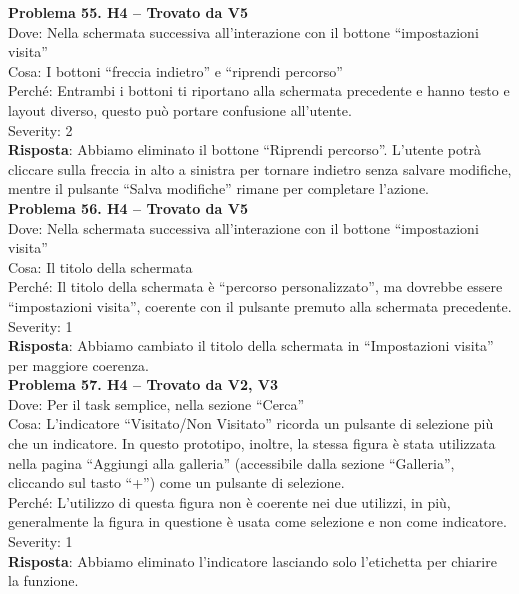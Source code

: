 \documentclass{article}
\begin{document}
\noindent \textbf{Problema 55. H4 – Trovato da V5} \\
Dove: Nella schermata successiva all’interazione con il bottone “impostazioni visita” \\
Cosa: I bottoni “freccia indietro” e “riprendi percorso” \\
Perché: Entrambi i bottoni ti riportano alla schermata precedente e hanno testo e layout diverso, questo può portare confusione all’utente. \\
Severity: 2 \\
\textbf{Risposta}: Abbiamo eliminato il bottone “Riprendi percorso”. L’utente potrà cliccare sulla freccia in alto a sinistra per tornare indietro senza salvare modifiche, mentre il pulsante “Salva modifiche” rimane per completare l’azione.\\

\noindent \textbf{Problema 56. H4 – Trovato da V5} \\
Dove: Nella schermata successiva all’interazione con il bottone “impostazioni visita” \\
Cosa: Il titolo della schermata \\
Perché: Il titolo della schermata è “percorso personalizzato”, ma dovrebbe essere “impostazioni visita”, coerente con il pulsante premuto alla schermata precedente. \\
Severity: 1 \\
\textbf{Risposta}: Abbiamo cambiato il titolo della schermata in “Impostazioni visita” per maggiore coerenza.\\

\noindent \textbf{Problema 57. H4 – Trovato da V2, V3} \\
Dove: Per il task semplice, nella sezione “Cerca” \\
Cosa: L’indicatore “Visitato/Non Visitato” ricorda un pulsante di selezione più che un indicatore. In questo prototipo, inoltre, la stessa figura è stata utilizzata nella pagina “Aggiungi alla galleria” (accessibile dalla sezione “Galleria”, cliccando sul tasto “+”) come un pulsante di selezione. \\
Perché: L’utilizzo di questa figura non è coerente nei due utilizzi, in più, generalmente la figura in questione è usata come selezione e non come indicatore. \\
Severity: 1 \\
\textbf{Risposta}: Abbiamo eliminato l’indicatore lasciando solo l’etichetta per chiarire la funzione.\\
\end{document}
